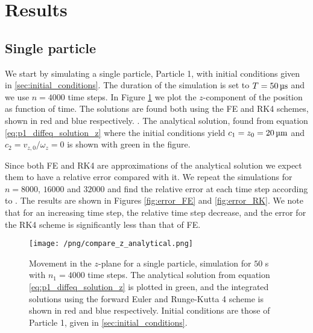 \section{Results}\label{sec:results}

\subsection{Single particle}\label{sec:one_particle}
We start by simulating a single particle, Particle 1, with initial conditions given in \ref{sec:initial_conditions}. The duration of the simulation is set to $T = 50 \,\mathrm{\text{\textmu} s}$ and we use $n=4000$ time steps. In Figure \ref{fig:compare_z_analytical} we plot the $z$-component of the position as function of time. The solutions are found both using the FE and RK4 schemes, shown in red and blue respectively.  . The analytical solution, found from equation \eqref{eq:p1_diffeq_solution_z} where the initial conditions yield $c_1 = z_0 = 20\,\mathrm{\text{\textmu}m}$ and $c_2 = v_{z,0}/\omega_z= 0$ is shown with green in the figure.

Since both FE and RK4 are approximations of the analytical solution we expect them to have a relative error compared with it. We repeat the simulations for $n = 8000$, $16000$ and $32000$ and find the relative error at each time step according to . The results are shown in Figures \ref{fig:error_FE} and \ref{fig:error_RK}. We note that for an increasing time step, the relative time step decrease, and the error for the RK4 scheme is significantly less than that of FE. 

\begin{figure}
    \texttt{[image: /png/compare\_z\_analytical.png]}
    \caption{Movement in the $z$-plane for a single particle, simulation for $50$ \textmu s with $n_1=4000$ time steps. The analytical solution from equation \eqref{eq:p1_diffeq_solution_z} is plotted in green, and the integrated solutions using the forward Euler and Runge-Kutta 4 scheme is shown in red and blue respectively. Initial conditions are those of Particle 1, given in \ref{sec:initial_conditions}.}
    \label{fig:compare_z_analytical}
\end{figure}


